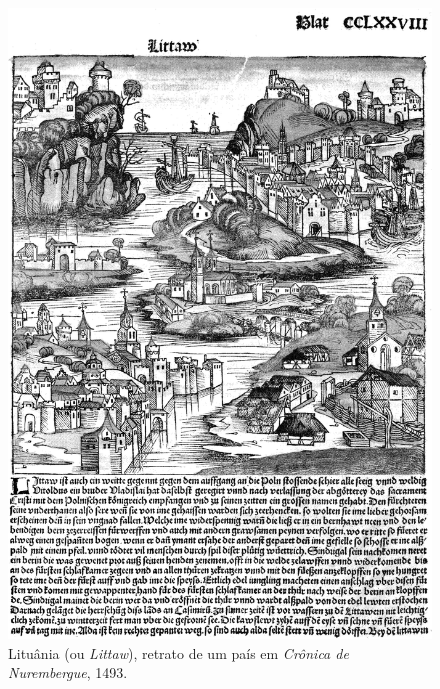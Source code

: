 

\begin{figure}[!hp]
    \centering
    \includegraphics[width=\textwidth]{ilustra-04.png}
    \caption{Lituânia (ou \textit{Littaw}), retrato de um país em \textit{Crônica de Nurembergue}, 1493.}
\end{figure}


